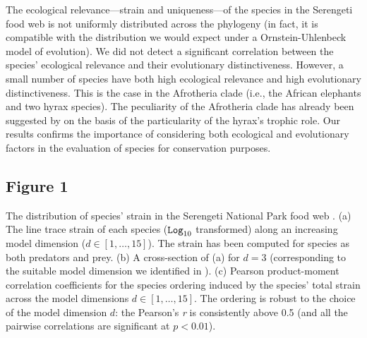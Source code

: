 \documentclass[12pt]{article}
\begin{document}
The ecological relevance---strain and uniqueness---of the species in the Serengeti food web
is not uniformly distributed across the phylogeny (in fact, it is compatible with the distribution
we would expect under a Ornstein-Uhlenbeck model of evolution). We did not detect a
significant correlation between the species' ecological relevance and their
evolutionary distinctiveness. However, a small number of species have both
high ecological relevance and high evolutionary distinctiveness. This is the
case in the Afrotheria clade (i.e., the African elephants and two hyrax species).
The peculiarity of the Afrotheria clade has already been suggested by \citet{baskerville2011spatial}
on the basis of the particularity of the hyrax's trophic role.
Our results confirms the importance of considering both ecological and evolutionary factors
in the evaluation of species for conservation purposes.


\begin{small}
	
\end{small}


\newpage
\appendix
\newpage
\small
\subsection*{Figure 1}
The distribution of species' strain in the Serengeti National Park food web
\citep{baskerville2011spatial}.
(a) The line trace strain of each species ($\mbox{\texttt{Log}}_{10}$ transformed) along
an increasing model dimension ($d \in \left[ 1, \dots , 15\right]$). The strain
has been computed for species as both predators and prey.
(b) A cross-section of (a) for $d  = 3$ (corresponding to the suitable model dimension we
identified in \citep{dallariva2015exploring}).
(c) Pearson product-moment correlation coefficients for the species ordering induced by the
species' total strain across the model dimensions $d \in \left[ 1, \dots , 15\right]$.
The ordering is robust to the choice of the model dimension $d$: the Pearson's \textit{r} is consistently
above 0.5 (and all the pairwise correlations are significant at $p < 0.01$).
\end{document}
